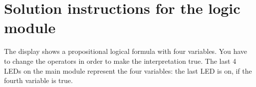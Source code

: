 \documentclass[a4paper, 12pt]{article}
\begin{document}
\section*{Solution instructions for the logic module}

The display shows a propositional logical formula with four variables. You have to change the operators in order to make the interpretation true. The last 4 LEDs on the main module represent the four variables: the last LED is on, if the fourth variable is true.
\end{document}
